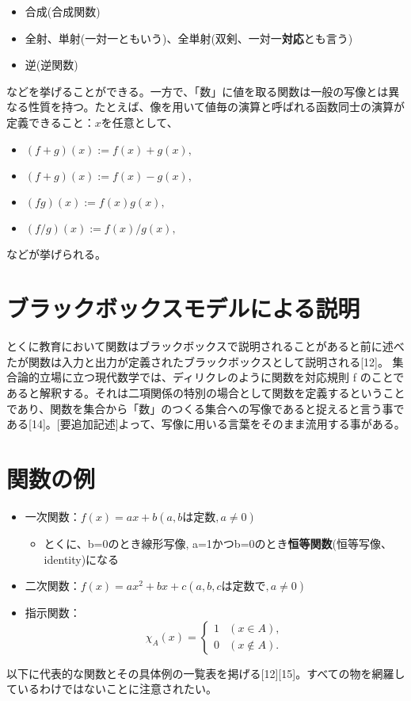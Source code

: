 \documentclass[a4j,12pt]{jreport}
\begin{document}
\begin{itemize}
\item 合成(合成関数)
\item 全射、単射(一対一ともいう)、全単射(双剣、一対一{\bf 対応}とも言う)
\item 逆(逆関数)
\end{itemize}
などを挙げることができる。一方で、「数」に値を取る関数は一般の写像とは異なる性質を持つ。たとえば、像を用いて値毎の演算と呼ばれる函数同士の演算が定義できること：$x$を任意として、

\begin{itemize}
\item $(f + g)(x) := f(x) + g(x),$
\item $(f + g)(x) := f(x) - g(x),$
\item $(fg)(x) := f(x)g(x),$
\item $(f/g)(x) := f(x)/g(x),$
\end{itemize}

などが挙げられる。
\chapter{ブラックボックスモデルによる説明}
とくに教育において関数はブラックボックスで説明されることがあると前に述べたが関数は入力と出力が定義されたブラックボックスとして説明される[12]。
集合論的立場に立つ現代数学では、ディリクレのように関数を対応規則 f のことであると解釈する。それは二項関係の特別の場合として関数を定義するということであり、関数を集合から「数」のつくる集合への写像であると捉えると言う事である[14]。[要追加記述]よって、写像に用いる言葉をそのまま流用する事がある。


\chapter{関数の例}
\begin{itemize}
 \item 一次関数：$f(x) = ax + b( a,bは定数, a ≠ 0 )$
 \begin{itemize}
  \item とくに、b=0のとき線形写像, a=1かつb=0のとき{\bf 恒等関数}(恒等写像、identity)になる
 \end{itemize}
 \item 二次関数：$f(x) = ax^2 + bx+c( a,b,cは定数で, a ≠ 0 )$
 \item 指示関数：
\begin{equation}
\chi_A (x) = \begin{cases}
  1 & (x \in A), \\
  0 & (x \notin A).
  \end{cases}
\end{equation}
\end{itemize}
以下に代表的な関数とその具体例の一覧表を掲げる[12][15]。すべての物を網羅しているわけではないことに注意されたい。
\end{document}
